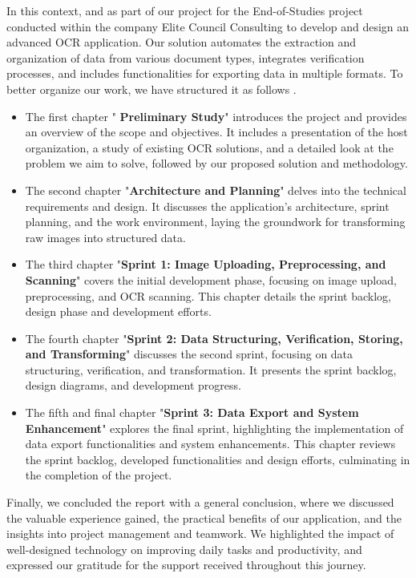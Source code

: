 In this context, and as part of our project for the End-of-Studies project conducted within the company Elite Council Consulting to develop and design an advanced OCR application. Our solution automates the extraction and organization of data from various document types, integrates verification processes, and includes functionalities for exporting data in multiple formats.
To better organize our work, we have structured it as follows .
 \begin{itemize}
     \item The first chapter "\textbf{ Preliminary Study}" introduces the project and provides an overview of the scope and objectives. It includes a presentation of the host organization, a study of existing OCR solutions, and a detailed look at the problem we aim to solve, followed by our proposed solution and methodology.
 \end{itemize}
 \begin{itemize}
     \item The second chapter "\textbf{Architecture and Planning}" delves into the technical requirements and design. It discusses the application's architecture, sprint planning, and the work environment, laying the groundwork for transforming raw images into structured data.
 \end{itemize}
 \begin{itemize}
     \item The third chapter "\textbf{Sprint 1: Image Uploading, Preprocessing, and Scanning}" covers the initial development phase, focusing on image upload, preprocessing, and OCR scanning. This chapter details the sprint backlog, design phase and development efforts.
     \end{itemize}
\begin{itemize}
    \item The fourth chapter "\textbf{Sprint 2: Data Structuring, Verification, Storing, and Transforming}" discusses the second sprint, focusing on data structuring, verification, and transformation. It presents the sprint backlog, design diagrams, and development progress.
\end{itemize}
\begin{itemize}
    \item The fifth and final chapter "\textbf{Sprint 3: Data Export and System Enhancement}" explores the final sprint, highlighting the implementation of data export functionalities and system enhancements. This chapter reviews the sprint backlog, developed functionalities and design efforts, culminating in the completion of the project.
\end{itemize}

Finally, we concluded the report with a general conclusion, where we discussed the valuable experience gained, the practical benefits of our application, and the insights into project management and teamwork. We highlighted the impact of well-designed technology on improving daily tasks and productivity, and expressed our gratitude for the support received throughout this journey.
